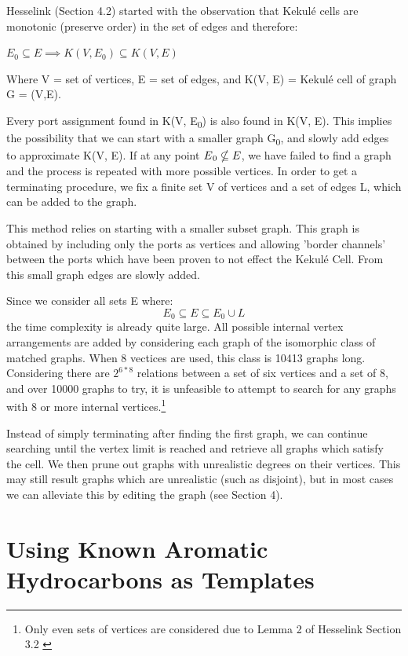 \documentclass[12pt]{article}
\begin{document}
Hesselink (Section 4.2) \cite{H13} started with the observation that Kekul\'{e} cells are monotonic (preserve order) in the set of edges and therefore: 

$E_0 \subseteq E \implies K(V, E_0) \subseteq K(V, E)$

Where V = set of vertices, E = set of edges, and K(V, E) = Kekul\'{e} cell of graph G = (V,E). 

Every port assignment found in K(V, E\textsubscript{0}) is also found in K(V, E). This implies the possibility that we can start with a smaller graph G\textsubscript{0}, and slowly add edges to approximate K(V, E). If at any point
$E\textsubscript0 \nsubseteq E$, we have failed to find a graph and
the process is repeated with more possible vertices. In order to get a terminating procedure, we fix a finite set V of vertices and a set of edges L, which can be added to the graph. 

This method relies on starting with a smaller subset graph. This graph is obtained by including only the ports as vertices and allowing 'border channels' between the ports which have been proven to not effect the Kekul\'{e} Cell. From this small graph edges are slowly added. 

Since we consider all sets E where: 
$$E_0 \subseteq E \subseteq E_0 \cup L$$
the time complexity is already quite large. All possible internal vertex arrangements are added by considering each graph of the isomorphic class of matched graphs. When 8 vectices are used, this class is 10413 graphs long. Considering there are $2^{6*8}$ relations between a set of six vertices and a set of 8, and over 10000 graphs to try, it is unfeasible to attempt to search for any graphs with 8 or more internal vertices.\footnote{Only even sets of vertices are considered due to Lemma 2 of Hesselink Section 3.2 \cite{H13}}

Instead of simply terminating after finding the first graph, we can continue searching until the vertex limit is reached and retrieve all graphs which satisfy the cell. We then prune out graphs with unrealistic degrees on their vertices. This may still result graphs which are unrealistic (such as disjoint), but in most cases we can alleviate this by editing the graph (see Section 4).


\section{Using Known Aromatic Hydrocarbons as Templates}
\end{document}
